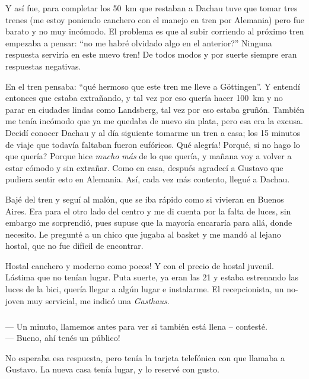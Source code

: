 Y as\'i fue, para completar los 50~km que restaban a Dachau tuve que tomar
tres trenes (me estoy poniendo canchero con el manejo en tren por Alemania)
pero fue barato y no muy inc\'omodo. El problema es que al subir corriendo al
pr\'oximo tren empezaba a pensar: ``\textquestiondown no me habr\'e olvidado
algo en el anterior?'' \textexclamdown Ninguna respuesta servir\'ia en este
nuevo tren! De todos modos y por suerte siempre eran respuestas negativas.

En el tren pensaba: ``qu\'e hermoso que este tren me lleve a G\"ottingen''. Y
entend\'i entonces que estaba extra\~nando, y tal vez por eso quer\'ia hacer
100~km y no parar en ciudades lindas como Landsberg, tal vez por eso estaba
gru\~n\'on. Tambi\'en me ten\'ia inc\'omodo que ya me quedaba de nuevo sin
plata, pero esa era la excusa. Decid\'i conocer Dachau y al d\'ia siguiente
tomarme un tren a casa; los 15 minutos de viaje que todav\'ia faltaban fueron
euf\'oricos. \textexclamdown Qu\'e alegr\'ia! \textquestiondown Porqu\'e, si
no hago lo que quer\'ia? Porque hice {\sl mucho m\'as} de lo que quer\'ia, y
ma\~nana voy a volver a estar c\'omodo y sin extra\~nar. Como en casa,
despu\'es agradec\'i a Gustavo que pudiera sentir esto en Alemania. As\'i,
cada vez m\'as contento, llegu\'e a Dachau.

Baj\'e del tren y segu\'i al mal\'on, que se iba r\'apido como si vivieran en
Buenos Aires. Era para el otro lado del centro y me di cuenta por la falta de
luces, sin embargo me sorprendi\'o, pues supuse que la mayor\'ia encarar\'ia
para all\'a, donde necesito. Le pregunt\'e a un chico que jugaba al basket y me
mand\'o al lejano hostal, que no fue dif\'icil de encontrar.

\textexclamdown Hostal canchero y moderno como pocos! Y con el precio de
hostal juvenil. L\'astima que no ten\'ian lugar. Puta suerte, ya eran las 21 y
estaba estrenando las luces de la bici, quer\'ia llegar a alg\'un lugar e
instalarme. El recepcionista, un no-joven muy servicial, me indic\'o una
\emph{Gasthaus}.

\subparagraph{}\label{ssub:hostalLleno} --- Un minuto, llamemos antes para ver
si tambi\'en est\'a llena -- contest\'e.\\ --- Bueno, \textexclamdown ah\'i
ten\'es un p\'ublico!\\ \hangindent=1cm

No esperaba esa respuesta, pero ten\'ia la tarjeta telef\'onica con que
llamaba a Gustavo. La nueva casa ten\'ia lugar, y lo reserv\'e con gusto.

